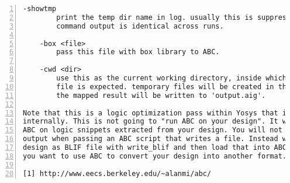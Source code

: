 \begin{lstlisting}[numbers=left,frame=single]
    -showtmp
        print the temp dir name in log. usually this is suppressed so that the
        command output is identical across runs.

    -box <file>
        pass this file with box library to ABC.

    -cwd <dir>
        use this as the current working directory, inside which the 'input.xaig'
        file is expected. temporary files will be created in this directory, and
        the mapped result will be written to 'output.aig'.

Note that this is a logic optimization pass within Yosys that is calling ABC
internally. This is not going to "run ABC on your design". It will instead run
ABC on logic snippets extracted from your design. You will not get any useful
output when passing an ABC script that writes a file. Instead write your full
design as BLIF file with write_blif and then load that into ABC externally if
you want to use ABC to convert your design into another format.

[1] http://www.eecs.berkeley.edu/~alanmi/abc/
\end{lstlisting}

